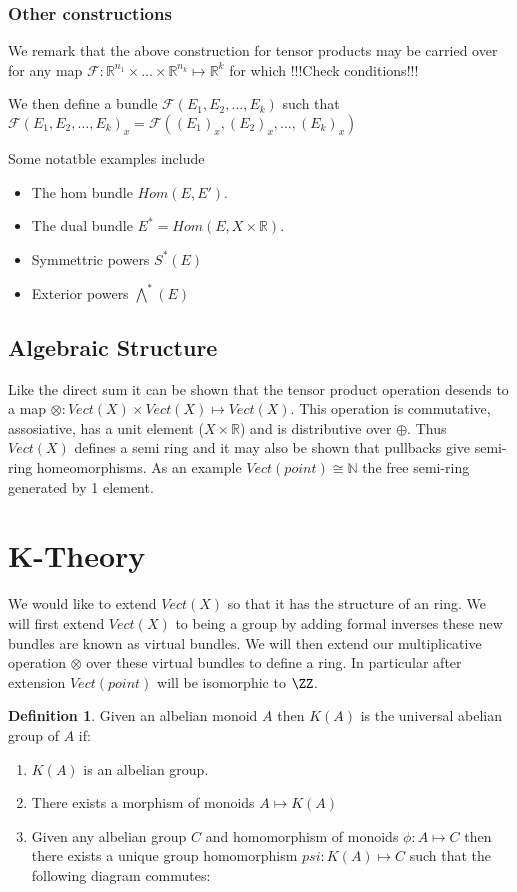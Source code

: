 \documentclass[a4paper,10pt]{article}
\theoremstyle{plain}%
\theoremstyle{definition}
\newtheorem{defn}{Definition}
\theoremstyle{remark}
\newcommand{\NN}{\mathbb{N}}
\newcommand{\RR}{\mathbb{R}}
\begin{document}
\subsubsection{Other constructions}

We remark that the above construction for tensor products may be carried over for any map $\mathcal{F}:\RR^{n_1}\times\ldots\times\RR^{n_k}\mapsto\RR^k$
for which !!!Check conditions!!!

We then define a bundle $\mathcal{F}(E_1,E_2,\ldots,E_k)$ such that $\mathcal{F}(E_1,E_2,\ldots,E_k)_x = \mathcal{F}((E_1)_x,(E_2)_x,\ldots,(E_k)_x)$

Some notatble examples include
\begin{itemize}
 \item The hom bundle $Hom(E,E')$.
 \item The dual bundle $E^\ast = Hom(E,X\times\RR)$.
 \item Symmettric powers $S^\ast(E)$
 \item Exterior powers $\bigwedge^\ast(E)$
\end{itemize}

\subsection{Algebraic Structure}

Like the direct sum it can be shown that the tensor product operation desends to a map 
$\otimes:Vect(X)\times Vect(X)\mapsto Vect(X)$. This operation is commutative, assosiative, has a unit element
($X\times\RR$) and is distributive over $\oplus$. Thus $Vect(X)$ defines a semi ring and it may also be shown that
pullbacks give semi-ring homeomorphisms. As an example $Vect(point)\cong\NN$ the free semi-ring generated by 1 element.


\section{K-Theory}


We would like to extend $Vect(X)$ so that it has the structure of an ring. We will first extend $Vect(X)$ to being a
group by adding formal inverses these new bundles are known as virtual bundles. We will then extend our multiplicative
operation $\otimes$ over these virtual bundles to define a ring. In particular after extension $Vect(point)$ will be 
isomorphic to $\ZZ$.

\begin{defn}
 Given an albelian monoid $A$ then $K(A)$ is the universal abelian group of $A$ if:
 \begin{enumerate}
  \item $K(A)$ is an albelian group.
  \item There exists a morphism of monoids $A\mapsto K(A)$
  \item Given any albelian group $C$ and homomorphism of monoids $\phi:A\mapsto C$ then there exists a unique
group homomorphism $psi:K(A)\mapsto C$ such that the following diagram commutes:
 \end{enumerate}
\end{defn}
\end{document}
